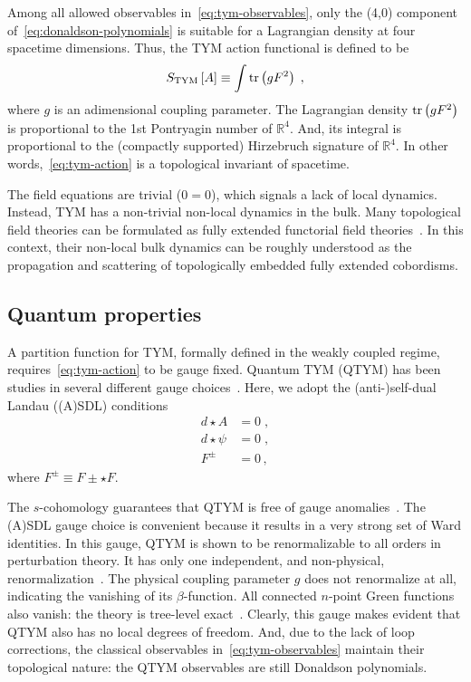 \documentclass[../main/tex]{subfiles}
\begin{document}
Among all allowed observables in~\eqref{eq:tym-observables}, only the (4,0) component of~\eqref{eq:donaldson-polynomials} is suitable for a Lagrangian density at four spacetime dimensions. Thus, the TYM action functional is defined to be
\begin{equation}\label{eq:tym-action}
  S_{\text{TYM}}\left[ A \right] \equiv  \int\operatorname{tr}\left( g F^2\right) \;,
\end{equation}
where $ g $ is an adimensional coupling parameter. The Lagrangian density $\operatorname{tr} \left(g F^2 \right)$ is proportional to the 1st Pontryagin number of $\mathbb{R}^4$. And, its integral is proportional to the (compactly supported) Hirzebruch signature of $\mathbb{R}^4$. In other words,~\eqref{eq:tym-action} is a topological  invariant of spacetime.

The field equations are trivial ($0=0$), which signals a lack of local dynamics. Instead, TYM has a non-trivial non-local dynamics in the bulk. Many topological field theories can be formulated as fully extended functorial field theories~\cite{atiyah1988a,segal1988a,baez1995a,schreiber2009a,baez2009a}. In this context, their non-local bulk dynamics can be roughly understood as the propagation and scattering of topologically embedded fully extended cobordisms.

\subsection{Quantum properties}\label{ssec:quantum-properties;sec:tym}

A partition function for TYM, formally defined in the weakly coupled regime, requires~\eqref{eq:tym-action} to be gauge fixed. Quantum TYM (QTYM) has been studies in several different gauge choices~\cite{baulieu1988a,myers1990c,brandhuber1994a,piguet1995a,sadovski2017c,sadovski2018a,sadovski2018b}. Here, we adopt the (anti-){}self-dual Landau ((A){}SDL) conditions
\begin{subequations}\label{eq:asdlg}
  \begin{align}
    d \star A    & = 0 \;, \\
    d \star \psi & = 0 \;, \\
    F^{\pm}      & = 0 \,,
  \end{align}
\end{subequations}
where $ F^{\pm} \equiv F \pm \star F $.

The $ s $-cohomology guarantees that QTYM is free of gauge anomalies~\cite{baulieu1988a}. The (A){}SDL gauge choice is convenient because it results in a very strong set of Ward identities. In this gauge, QTYM is shown to be renormalizable to all orders in perturbation theory. It has only one independent, and non-physical, renormalization~\cite{sadovski2017c}. The physical coupling parameter $g$ does not renormalize at all, indicating the vanishing of its $\beta$-function. All connected $n$-point Green functions also vanish: the theory is tree-level exact~\cite{sadovski2018a}. Clearly, this gauge makes evident that QTYM also has no local degrees of freedom. And, due to the lack of loop corrections, the classical observables in~\eqref{eq:tym-observables} maintain their topological nature: the QTYM observables are still Donaldson polynomials.
\end{document}
